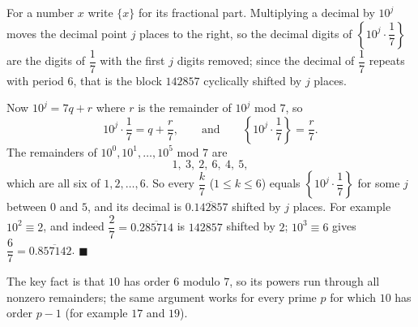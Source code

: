 For a number $x$ write $\{x\}$ for its fractional part. Multiplying a decimal by $10^j$ moves the decimal point $j$ places to the right, so the decimal digits of $\left\{10^j\cdot\dfrac{1}{7}\right\}$ are the digits of $\dfrac{1}{7}$ with the first $j$ digits removed; since the decimal of $\dfrac{1}{7}$ repeats with period $6$, that is the block $142857$ cyclically shifted by $j$ places.

Now $10^j=7q+r$ where $r$ is the remainder of $10^j$ mod $7$, so
\[
10^j\cdot\dfrac{1}{7}=q+\dfrac{r}{7},\qquad\text{and}\qquad \left\{10^j\cdot\dfrac{1}{7}\right\}=\dfrac{r}{7}.
\]
The remainders of $10^0,10^1,\dots,10^5$ mod $7$ are
\[
1,\ 3,\ 2,\ 6,\ 4,\ 5,
\]
which are all six of $1,2,\dots,6$. So every $\dfrac{k}{7}$ ($1\le k\le6$) equals $\left\{10^j\cdot\dfrac{1}{7}\right\}$ for some $j$ between $0$ and $5$, and its decimal is $0.\overline{142857}$ shifted by $j$ places. For example $10^2\equiv2$, and indeed $\dfrac{2}{7}=0.\overline{285714}$ is $142857$ shifted by $2$; $10^3\equiv6$ gives $\dfrac{6}{7}=0.\overline{857142}$. $\blacksquare$

The key fact is that $10$ has order $6$ modulo $7$, so its powers run through all nonzero remainders; the same argument works for every prime $p$ for which $10$ has order $p-1$ (for example $17$ and $19$).
